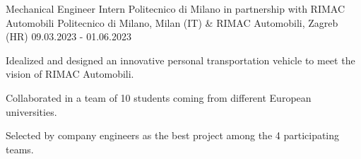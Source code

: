 
\cventry
{Mechanical Engineer Intern}
{Politecnico di Milano in partnership with RIMAC Automobili}
{Politecnico di Milano, Milan (IT) \& RIMAC Automobili, Zagreb (HR)}
{09.03.2023 - 01.06.2023}
{
    \begin{cvitems}
        \item {Idealized and designed an innovative personal transportation vehicle to meet the vision of RIMAC Automobili.}
        \item {Collaborated in a team of 10 students coming from different European universities.}
        \item {Selected by company engineers as the best project among the 4 participating teams.}
    \end{cvitems}
}